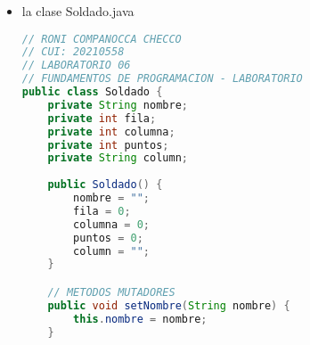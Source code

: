 \documentclass{article}
\begin{document}
\begin{itemize}
\begin{itemize}
\begin{lstlisting}[language=java]
        Soldado aux = new Soldado();
        for (int i = 0; i < listaSoldados.size() - 1; i++) {
            for (int j = 0; j < listaSoldados.size() - i - 1; j++) {
                if (listaSoldados.get(j).getPuntos() < listaSoldados.get(j + 1).getPuntos()) {
                    aux = listaSoldados.get(j);
                    listaSoldados.set(j, listaSoldados.get(j + 1));
                    listaSoldados.set(j + 1, aux);
                }
            }
        }
    
        // Actualizar el HashMap con los soldados ordenados
        int index = 0;
        for (String clave : soldados.keySet()) {
            soldados.put(clave, listaSoldados.get(index));
            index++;
        }
    }

    // METODO QUE NOS AYUDA A ORDENAR LOS SOLDADOS DE ACUERDO A SU NIVEL DE VIDA, EN ESTA OCACION DIFERENTE A LA ANTERIOR QUE ERA ALGORITMO DE BURBUJA
    public static void ordenarPorVidaMetodoB(HashMap<String, Soldado> soldados) {
        // Obtener los valores (los soldados) del HashMap y almacenarlos en una lista
        List<Soldado> listaSoldados = new ArrayList<>(soldados.values());
    
        // Ordenar la lista en orden descendente por puntos de vida
        Collections.sort(listaSoldados, new Comparator<Soldado>() {
            public int compare(Soldado s1, Soldado s2) {
                // Orden descendente por puntos de vida
                return Integer.compare(s2.getPuntos(), s1.getPuntos());
            }
        });
    
        // Actualizar el HashMap con los soldados ordenados
        int index = 0;
        for (String clave : soldados.keySet()) {
            soldados.put(clave, listaSoldados.get(index));
            index++;
        }
    }
}
        \end{lstlisting}

        \item la clase Soldado.java
        \begin{lstlisting}[language=java]
// RONI COMPANOCCA CHECCO
// CUI: 20210558
// LABORATORIO 06
// FUNDAMENTOS DE PROGRAMACION - LABORATORIO
public class Soldado {
	private String nombre;
	private int fila;
	private int columna;
	private int puntos;
	private String column;
	
	public Soldado() {
		nombre = "";
		fila = 0;
		columna = 0;
		puntos = 0;
		column = "";
	}

	// METODOS MUTADORES
	public void setNombre(String nombre) {
		this.nombre = nombre;
	}


\end{lstlisting}
\end{itemize}
\end{itemize}
\end{document}
